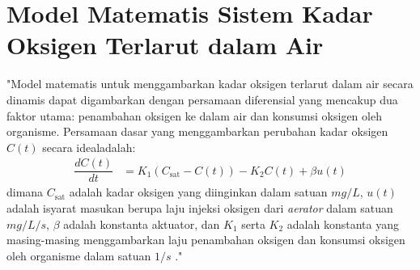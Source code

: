 \section{Model Matematis Sistem Kadar Oksigen Terlarut dalam Air}
\label{sec:Model_Matematis_dan_Input_Kontrol_pada_Sistem_Kadar_Oksigen_Terlarut_dalam_Air}

"Model matematis untuk menggambarkan kadar oksigen terlarut dalam air secara dinamis dapat digambarkan dengan persamaan diferensial yang mencakup dua faktor utama: penambahan oksigen ke dalam air dan konsumsi oksigen oleh organisme. Persamaan dasar yang menggambarkan perubahan kadar oksigen $C(t)$ secara idealadalah:
\begin{align}
    \dfrac{dC(t)}{dt} &
    = K_1 (C_{\text{sat}} - C(t)) - K_2 C(t) + \beta u(t)
    \label{eqn:model_matematis_oksigen}
\end{align}
dimana $C_{\text{sat}}$ adalah kadar oksigen yang diinginkan dalam satuan $mg/L$, $u(t)$ adalah isyarat masukan berupa laju injeksi oksigen dari \textit{aerator} dalam satuan $mg/L/s$, $\beta$ adalah konstanta aktuator, dan $K_1$ serta $K_2$ adalah konstanta yang masing-masing menggambarkan laju penambahan oksigen dan konsumsi oksigen oleh organisme dalam satuan $1/s$ \cite{SmithJ_modeling_2015, jones_aeration_2017}."
